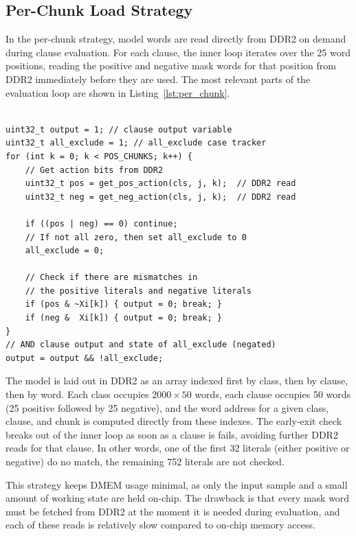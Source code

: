 \subsection{Per-Chunk Load Strategy}
\label{sec:per_chunk}

In the per-chunk strategy, model words are read directly from DDR2 on demand during clause evaluation. For each clause, the inner loop iterates over the 25 word positions, reading the positive and negative mask words for that position from DDR2 immediately before they are used. The most relevant parts of the evaluation loop are shown in Listing~\ref{lst:per_chunk}.

\begin{code}
\label{lst:per_chunk}
\begin{verbatim}

uint32_t output = 1; // clause output variable    
uint32_t all_exclude = 1; // all_exclude case tracker
for (int k = 0; k < POS_CHUNKS; k++) {
    // Get action bits from DDR2
    uint32_t pos = get_pos_action(cls, j, k);  // DDR2 read
    uint32_t neg = get_neg_action(cls, j, k);  // DDR2 read

    if ((pos | neg) == 0) continue;
    // If not all zero, then set all_exclude to 0
    all_exclude = 0; 

    // Check if there are mismatches in 
    // the positive literals and negative literals
    if (pos & ~Xi[k]) { output = 0; break; } 
    if (neg &  Xi[k]) { output = 0; break; }
}
// AND clause output and state of all_exclude (negated)
output = output && !all_exclude; 
\end{verbatim}
\end{code}

The model is laid out in DDR2 as an array indexed first by class, then by clause, then by word. Each class occupies $2000 \times 50$ words, each clause occupies 50 words (25 positive followed by 25 negative), and the word address for a given class, clause, and chunk is computed directly from these indexes. The early-exit check breaks out of the inner loop as soon as a clause is fails, avoiding further DDR2 reads for that clause. In other words, one of the first 32 literals (either positive or negative) do no match, the remaining 752 literals are not checked.

This strategy keeps DMEM usage minimal, as only the input sample and a small amount of working state are held on-chip. The drawback is that every mask word must be fetched from DDR2 at the moment it is needed during evaluation, and each of these reads is relatively slow compared to on-chip memory access.


